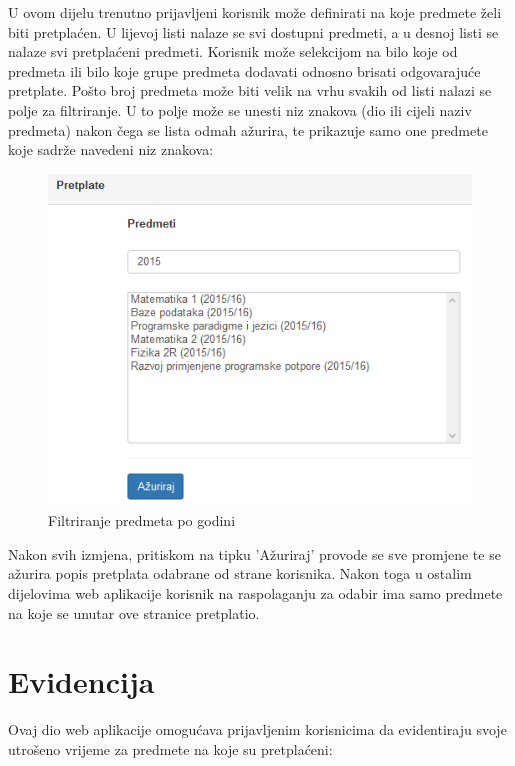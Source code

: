 \documentclass[times, utf8, zavrsni]{fer}
\begin{document}
U ovom dijelu trenutno prijavljeni korisnik može definirati na koje predmete želi biti pretplaćen. U lijevoj listi nalaze se svi dostupni predmeti, a u desnoj listi se nalaze svi pretplaćeni predmeti. Korisnik može selekcijom na bilo koje od predmeta ili bilo koje grupe predmeta dodavati odnosno brisati odgovarajuće pretplate. Pošto broj predmeta može biti velik na vrhu svakih od listi nalazi se polje za filtriranje. U to polje može se unesti niz znakova (dio ili cijeli naziv predmeta) nakon čega se lista odmah ažurira, te prikazuje samo one predmete koje sadrže navedeni niz znakova:

\begin{figure}[H]
\centering
\includegraphics[width=\textwidth,height=\textheight,keepaspectratio]{img/filtriranje.png}
\caption{Filtriranje predmeta po godini}
\label{fig:filtriranje}
\end{figure}

Nakon svih izmjena, pritiskom na tipku 'Ažuriraj' provode se sve promjene te se ažurira popis pretplata odabrane od strane korisnika. Nakon toga u ostalim dijelovima web aplikacije korisnik na raspolaganju za odabir ima samo predmete na koje se unutar ove stranice pretplatio.
\clearpage

\section{Evidencija}
Ovaj dio web aplikacije omogućava prijavljenim korisnicima da evidentiraju svoje utrošeno vrijeme za predmete na koje su pretplaćeni:
\end{document}
